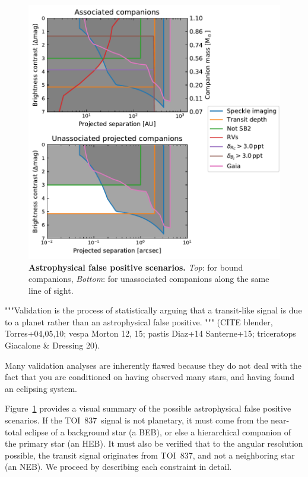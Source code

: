 \documentclass[12pt,twocolumn,tighten]{aastex62}
\newcommand{\tn}{TOI~837} %
\begin{document}
\begin{figure}[t!]
	\begin{center}
		\leavevmode
		\includegraphics[width=1\textwidth]{f4.pdf}
	\end{center}
	\vspace{-0.7cm}
	\caption{
		{\bf Astrophysical false positive scenarios.}
		{\it Top}: for bound companions,
		{\it Bottom}: for unassociated companions along the same line of
		sight.
		\label{fig:fpscenario}
	}
\end{figure}




"""Validation is the process of statistically arguing that a
transit-like signal is due to a planet rather than an astrophysical
false positive. """
(CITE blender, Torres+04,05,10; vespa Morton 12, 15; pastis Diaz+14
Santerne+15; triceratops Giacalone \& Dressing 20).

Many validation analyses are inherently flawed because they do
not deal with the fact that you are conditioned on having observed
many stars, and having found an eclipsing system.

Figure~\ref{fig:fpscenario} provides a visual summary of the possible
astrophysical false positive scenarios.  If the \tn\ signal is not
planetary, it must come from the near-total eclipse of a background
star (a BEB), or else a hierarchical companion of the primary star
(an HEB).  It must also be verified that to the angular resolution
possible, the transit signal originates from \tn, and not a
neighboring star (an NEB).
We proceed by describing each constraint in detail.
\end{document}
